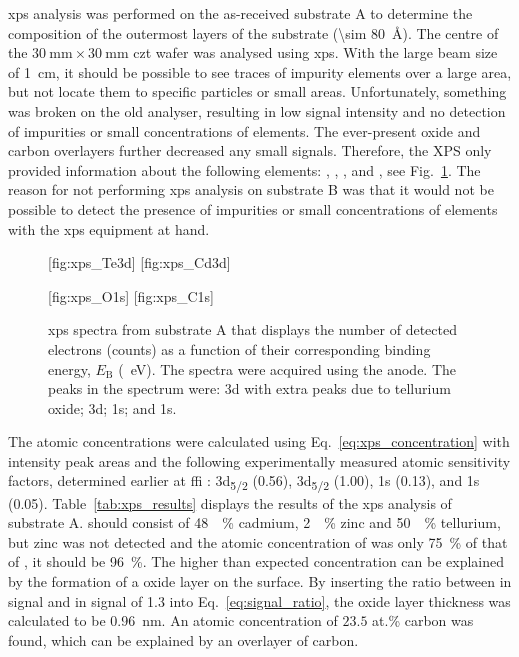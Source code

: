 \Ac{xps} analysis was performed on the as-received substrate A to determine the composition of the outermost layers of the substrate (\SI{\sim 80}{\angstrom}). The centre of the $\SI{30}{\milli\metre}\times\SI{30}{\milli\metre}$ \ac{czt} wafer was analysed using \ac{xps}. With the large beam size of \SI{1}{\centi\metre}, it should be possible to see traces of impurity elements over a large area, but not locate them to specific particles or small areas. Unfortunately, something was broken on the old analyser, resulting in low signal intensity and no detection of impurities or small concentrations of elements. The ever-present oxide and carbon overlayers further decreased any small signals. Therefore, the XPS only provided information about the following elements: , , , and , see Fig.~\ref{fig:xps_spectra}. The reason for not performing \ac{xps} analysis on substrate B was that it would not be possible to detect the presence of impurities or small concentrations of elements with the \ac{xps} equipment at hand.

\begin{figure}[htbp]
    \centering
    [fig:xps_Te3d]
    \hfill
    [fig:xps_Cd3d]
    \par\bigskip
    [fig:xps_O1s]
    \hfill
    [fig:xps_C1s]
    \caption[\Ac{xps} spectra from substrate A.]{\Ac{xps} spectra from substrate A that displays the number of detected electrons (counts) as a function of their corresponding binding energy, $E_\mathrm{B}$ (\SI{}{\electronvolt}). The spectra were acquired using the  anode. The peaks in the spectrum were:   3d with extra peaks due to tellurium oxide;   3d;   1s; and   1s.}
    \label{fig:xps_spectra}
\end{figure}
 
The atomic concentrations were calculated using Eq.~\eqref{eq:xps_concentration} with intensity peak areas and the following experimentally measured atomic sensitivity factors, determined earlier at \ac{ffi} \citep{hirsch1999x-ray}:  3d\textsubscript{5/2} (0.56),  3d\textsubscript{5/2} (1.00),  1s (0.13), and  1s (0.05). Table~\ref{tab:xps_results} displays the results of the \ac{xps} analysis of substrate A.  should consist of \SI{48}{\atomic\percent} cadmium, \SI{2}{\atomic\percent} zinc and \SI{50}{\atomic\percent} tellurium, but zinc was not detected and the atomic concentration of  was only \SI{75}{\percent} of that of , it should be \SI{96}{\percent}. The higher than expected  concentration can be explained by the formation of a  oxide layer on the surface. By inserting the ratio between  in  signal and  in  signal of \SI{1.3}{} into Eq.~\eqref{eq:signal_ratio}, the  oxide layer thickness was calculated to be \SI{0.96}{\nano\metre}. An atomic concentration of $23.5$ at.\% carbon was found, which can be explained by an overlayer of carbon. 

